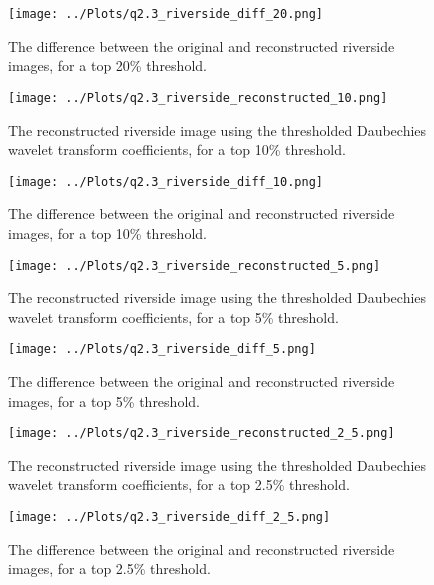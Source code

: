 \documentclass[12pt]{report} %
\begin{document}
\begin{figure}[htbp]
    \centering
    \texttt{[image: ../Plots/q2.3\_riverside\_diff\_20.png]}
    \caption{The difference between the original and reconstructed riverside images, for a top 20\% threshold.}
    \label{fig:diff_image20}
\end{figure}

\begin{figure}[htbp]
    \centering
    \texttt{[image: ../Plots/q2.3\_riverside\_reconstructed\_10.png]}
    \caption{The reconstructed riverside image using the thresholded Daubechies wavelet transform coefficients, for a top 10\% threshold.}
    \label{fig:reconstructed_image10}
\end{figure}

\begin{figure}[htbp]
    \centering
    \texttt{[image: ../Plots/q2.3\_riverside\_diff\_10.png]}
    \caption{The difference between the original and reconstructed riverside images, for a top 10\% threshold.}
    \label{fig:diff_image10}
\end{figure}


\begin{figure}[htbp]
    \centering
    \texttt{[image: ../Plots/q2.3\_riverside\_reconstructed\_5.png]}
    \caption{The reconstructed riverside image using the thresholded Daubechies wavelet transform coefficients, for a top 5\% threshold.}
    \label{fig:reconstructed_image5}
\end{figure}

\begin{figure}[htbp]
    \centering
    \texttt{[image: ../Plots/q2.3\_riverside\_diff\_5.png]}
    \caption{The difference between the original and reconstructed riverside images, for a top 5\% threshold.}
    \label{fig:diff_image5}
\end{figure}

\begin{figure}[htbp]
    \centering
    \texttt{[image: ../Plots/q2.3\_riverside\_reconstructed\_2\_5.png]}
    \caption{The reconstructed riverside image using the thresholded Daubechies wavelet transform coefficients, for a top 2.5\% threshold.}
    \label{fig:reconstructed_image2.5}
\end{figure}

\begin{figure}[htbp]
    \centering
    \texttt{[image: ../Plots/q2.3\_riverside\_diff\_2\_5.png]}
    \caption{The difference between the original and reconstructed riverside images, for a top 2.5\% threshold.}
    \label{fig:diff_image2.5}
\end{figure}





\end{document}
